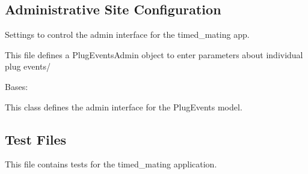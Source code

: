 \documentclass[letterpaper,10pt,english]{sphinxmanual}
\begin{document}
\begin{fulllineitems}

\begin{fulllineitems}
\label{api:timed_mating.urls.limited_object_detail}
\end{fulllineitems}


\begin{fulllineitems}
\label{api:timed_mating.urls.limited_object_list}
\end{fulllineitems}



\subsection{Administrative Site Configuration}
\label{api:id9}\label{api:module-timed_mating.admin}
Settings to control the admin interface for the timed\_mating app.

This file defines a PlugEventsAdmin object to enter parameters about individual plug events/

\begin{fulllineitems}
\label{api:timed_mating.admin.PlugEventsAdmin}
Bases: 

This class defines the admin interface for the PlugEvents model.

\begin{fulllineitems}
\label{api:timed_mating.admin.PlugEventsAdmin.media}
\end{fulllineitems}


\end{fulllineitems}



\subsection{Test Files}
\label{api:id10}\label{api:module-timed_mating.tests}
This file contains tests for the timed\_mating application.


\end{fulllineitems}
\end{document}
